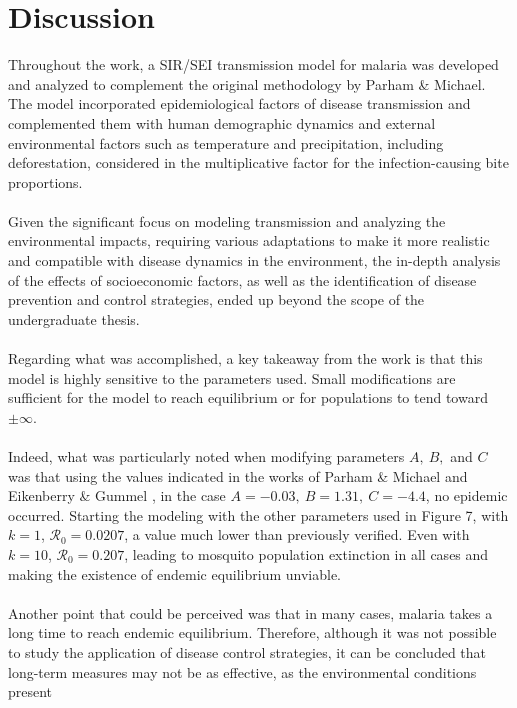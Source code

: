 \chapter{Discussion}

Throughout the work, a SIR/SEI transmission model for malaria was 
developed and analyzed to complement the original methodology by 
Parham \& Michael. The model incorporated epidemiological factors of 
disease transmission and complemented them with human demographic dynamics 
and external environmental factors such as temperature and precipitation, 
including deforestation, considered in the multiplicative factor for the 
infection-causing bite proportions.
\\\\
Given the significant focus on modeling transmission and analyzing the 
environmental impacts, requiring various adaptations to make it more realistic 
and compatible with disease dynamics in the environment, the in-depth analysis 
of the effects of socioeconomic factors, as well as the identification of 
disease prevention and control strategies, ended up beyond the scope of the 
undergraduate thesis.
\\\\
Regarding what was accomplished, a key takeaway from the work is that 
this model is highly sensitive to the parameters used. Small modifications 
are sufficient for the model to reach equilibrium or for populations to tend 
toward $\pm \infty$.
\\\\
Indeed, what was particularly noted when modifying parameters 
$A, \ B,$ and $C$ was that using the values indicated in the 
works of Parham \& Michael \cite{Parham2010} and Eikenberry \& 
Gummel \cite{OKUNEYE201772}, in the case 
$A = -0.03, \ B = 1.31, \ C = -4.4$, no epidemic occurred. 
Starting the modeling with the other parameters used in 
Figure 7, with $k=1$, $\mathcal{R}_0 = 0.0207$, a value 
much lower than previously verified. Even with $k=10$, $\mathcal{R}_0 = 0.207$, 
leading to mosquito population extinction in all cases and making the 
existence of endemic equilibrium unviable.
\\\\
Another point that could be perceived was that in many cases, 
malaria takes a long time to reach endemic equilibrium. Therefore, 
although it was not possible to study the application of disease 
control strategies, it can be concluded that long-term measures 
may not be as effective, as the environmental conditions present 
